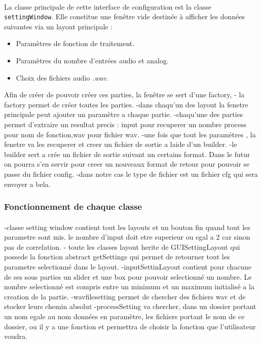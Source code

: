  
 \paragraph{}
 La classe principale de cette interface de configuration est la
 classe \verb!settingWindow!. Elle constitue une fenêtre vide
 destinée à afficher les données suivantes via un layout principale :
 \begin{itemize}
  \item Paramètres de fonction de traitement.
  \item Paramètres du nombre d'entrées audio et analog.
  \item Choix des fichiers audio \textit{.wav}.
 \end{itemize}
 Afin de créer de pouvoir créer ces parties, la fenêtre se sert d'une factory,
 - la factory permet de créer toutes les parties.
 -dans chaqu'un des layout la fenetre principale peut ajouter un paramètre a chaque
 partie.
 -chaqu'une des parties permet d'extraire un resultat precis : input pour recuperer un nombre
 process pour nom de fonction,wav pour fichier wav.
 -une fois que tout les paramètres , la fenetre va les recuperer et creer un
 fichier de sortie a laide d'un builder.
 -le builder sert a crée un fichier de sortie suivant un certains format. Dans le
 futur on pourra s'en servir pour creer un nouveaux format de retour pour pouvoir
 se passe du fichier config.
 -dans notre cas le type de fichier est un fichier cfg qui sera envoyer a bela.
 
 \subsubsection{Fonctionnement de chaque classe}
 \paragraph{}
 -classe setting window contient tout les layouts et un bouton fin quand tout les
 parametre sont mis. le nombre d'input doit etre superieur ou egal a 2 car sinon pas de
 correlation.
 - toute les classes layout herite de GUISettingLayout qui possede la fonction
 abstract getSettings qui permet de retourner tout les parametre selectionné dans le layout.
 -inputSettinLayout contient pour chacune de ses sous parties un slider et une box
 pour pouvoir selectionné un nombre. Le nombre selectionné est compris entre un
 minimum et un maximum initialisé a la creation de la partie.
 -wavfilesetting permet de chercher des fichiers wav et de stocker leurs chemin
 absolut
 -processSetting va chercher, dans un dossier portant un nom egale au nom données
 en paramètre, les fichiers portant le nom de ce dossier, ou il y a une fonction
 et permettra de choisir la fonction que l'utilisateur voudra.
 
